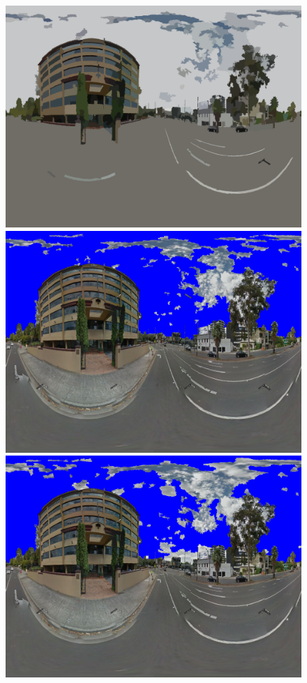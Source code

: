 \documentclass{article}
\begin{document}
\begin{figure}
\includegraphics[scale=0.08]{Images/mean/4880_7_8_300.png}
\\ 
\includegraphics[scale=0.08]{Images/mean/4880_3_6_100_ms_sky_mark.png} 
\includegraphics[scale=0.08]{Images/mean/4880_7_6_100_ms_sky_mark.png} 

\end{figure}
\end{document}

